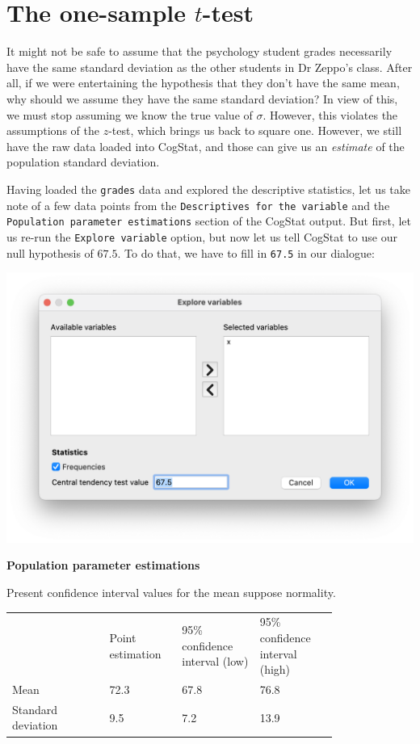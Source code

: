\documentclass[
  11pt,
  a4paper,
  twoside,symmetric,openright]{book}
\theoremstyle{break}
\theoremstyle{break}
\begin{document}
\section{\texorpdfstring{The one-sample \(t\)-test}{The one-sample t-test}}\label{onesamplettest}

It might not be safe to assume that the psychology student grades necessarily have the same standard deviation as the other students in Dr Zeppo's class. After all, if we were entertaining the hypothesis that they don't have the same mean, why should we assume they have the same standard deviation? In view of this, we must stop assuming we know the true value of \(\sigma\). However, this violates the assumptions of the \(z\)-test, which brings us back to square one. However, we still have the raw data loaded into CogStat, and those can give us an \emph{estimate} of the population standard deviation.

Having loaded the \texttt{grades} data and explored the descriptive statistics, let us take note of a few data points from the \texttt{Descriptives\ for\ the\ variable} and the \texttt{Population\ parameter\ estimations} section of the CogStat output. But first, let us re-run the \texttt{Explore\ variable} option, but now let us tell CogStat to use our null hypothesis of \(67.5\). To do that, we have to fill in \texttt{67.5} in our dialogue:

\begin{center}\includegraphics[width=0.6\linewidth]{resources/image/centraltendency} \end{center}

\begin{tcolorbox}[colback=white,
  colframe=lightgray,
  coltext=black,
  boxsep=4pt,
  boxrule=0.3pt,
  arc=0pt]
  {  \sffamily
     \color{CSblue}\textbf{Population parameter estimations}

    \color{black}
    Present confidence interval values for the mean suppose normality.

    \begin{longtable}[l]{p{0.25\linewidth}p{0.15\linewidth}p{0.20\linewidth}p{0.20\linewidth}}
    \endhead
    
    & Point estimation 
    & 95\% confidence interval (low) 
    & 95\% confidence
    interval (high) \\
    Mean & 72.3 & 67.8 & 76.8 \\
    Standard deviation & 9.5 & 7.2 & 13.9 \\
    \end{longtable}
  }
\end{tcolorbox}
\end{document}
